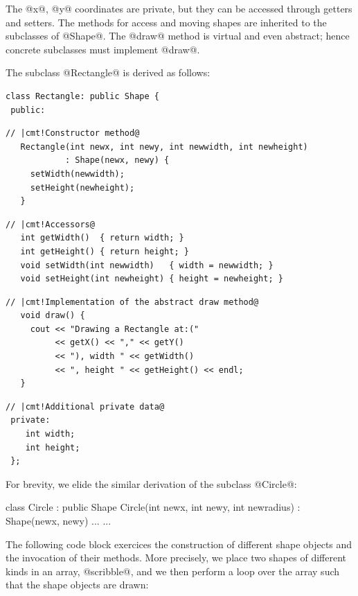 \documentclass{jfp}
\begin{document}
The @x@, @y@ coordinates are private, but they can be accessed through
getters and setters. The methods for access and moving shapes are
inherited to the subclasses of @Shape@. The @draw@ method is virtual
and even abstract; hence concrete subclasses must implement @draw@.

\newpage 

The subclass @Rectangle@ is derived as follows:

\begin{Verbatim}[fontsize=\small,commandchars=\|\!\@]
 class Rectangle: public Shape {
 public:
\end{Verbatim}

\begin{Verbatim}[fontsize=\small,commandchars=\|\!\@]
   // |cmt!Constructor method@
   Rectangle(int newx, int newy, int newwidth, int newheight)
            : Shape(newx, newy) {
     setWidth(newwidth);
     setHeight(newheight);
   }
\end{Verbatim}

\begin{Verbatim}[fontsize=\small,commandchars=\|\!\@]
   // |cmt!Accessors@
   int getWidth()  { return width; }
   int getHeight() { return height; }
   void setWidth(int newwidth)   { width = newwidth; }
   void setHeight(int newheight) { height = newheight; }
\end{Verbatim}

\begin{Verbatim}[fontsize=\small,commandchars=\|\!\@]
   // |cmt!Implementation of the abstract draw method@
   void draw() {
     cout << "Drawing a Rectangle at:("
          << getX() << "," << getY()
          << "), width " << getWidth()
          << ", height " << getHeight() << endl;
   }
\end{Verbatim}

\begin{Verbatim}[fontsize=\small,commandchars=\|\!\@]
 // |cmt!Additional private data@
 private:
    int width;
    int height;
 };
\end{Verbatim}

For brevity, we elide the similar derivation of the subclass @Circle@:

\begin{code}
 class Circle : public Shape {
  Circle(int newx, int newy, int newradius)
        : Shape(newx, newy) { ... }
  ...
 }
\end{code}

The following code block exercices the construction of different shape
objects and the invocation of their methods. More precisely, we place
two shapes of different kinds in an array, @scribble@, and we then
perform a loop over the array such that the shape objects are drawn:
\end{document}
